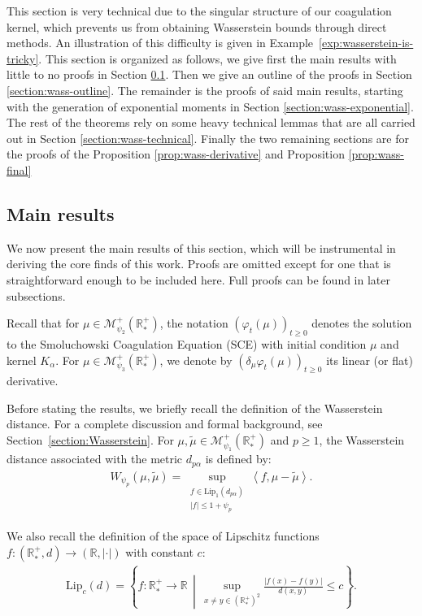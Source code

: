 \documentclass[11pt,a4paper]{article}
\newcommand{\RR}{\mathbb{R}}
\newcommand{\RRP}{\mathbb{R}^+_*}
\newcommand{\MC}{\mathcal{M}}
\newcommand{\Proc}[1]{\left(#1\right)_{t\geq 0}}
\newcommand{\brac}[1]{\left\langle#1\right\rangle}
\begin{document}
This section is very technical due to the singular structure of our coagulation kernel, which prevents us from obtaining Wasserstein bounds through direct methods. An illustration of this difficulty is given in Example~\ref{exp:wasserstein-is-tricky}. This section is organized as follows, we give first the main results with little to no proofs in Section \ref{section:wass-main-results}. Then we give an outline of the proofs in Section \ref{section:wass-outline}. The remainder is the proofs of said main results, starting with the generation of exponential moments in Section \ref{section:wass-exponential}. The rest of the theorems rely on some heavy technical lemmas that are all carried out in Section \ref{section:wass-technical}. Finally the two remaining sections are for the proofs of the Proposition \ref{prop:wass-derivative} and Proposition \ref{prop:wass-final}

\subsection{Main results}\label{section:wass-main-results}
We now present the main results of this section, which will be instrumental in deriving the core finds of this work. Proofs are omitted except for one that is straightforward enough to be included here. Full proofs can be found in later subsections.

Recall that for $\mu \in \MC^+_{\psi_2}(\RRP)$, the notation $\Proc{\varphi_t(\mu)}$ denotes the solution to the Smoluchowski Coagulation Equation (SCE) with initial condition $\mu$ and kernel $K_\alpha$. For $\mu \in \MC^+_{\psi_3}(\RRP)$, we denote by $\Proc{\delta_\mu\varphi_t(\mu)}$ its linear (or flat) derivative.

Before stating the results, we briefly recall the definition of the Wasserstein distance. For a complete discussion and formal background, see Section~\ref{section:Wasserstein}. For $\mu, \tilde{\mu} \in \MC_{\psi_1}^+(\RRP)$ and $p \geq 1$, the Wasserstein distance associated with the metric $d_{p\alpha}$ is defined by:
\begin{align*}
    W_{\psi_p}(\mu,\tilde{\mu}) = \sup\limits_{\substack{f \in \mathrm{Lip}_1(d_{p\alpha}) \\ |f| \leq 1 + \psi_p}} \brac{f, \mu - \tilde{\mu}}.
\end{align*}

We also recall the definition of the space of Lipschitz functions $f: (\RRP, d) \to (\RR, |\cdot|)$ with constant $c$:
\begin{align*}
    \mathrm{Lip}_c(d) = \left\lbrace f: \RRP \to \RR \,\middle|\, \sup\limits_{x \neq y \in (\RRP)^2} \frac{|f(x) - f(y)|}{d(x,y)} \leq c \right\rbrace.
\end{align*}
\end{document}

